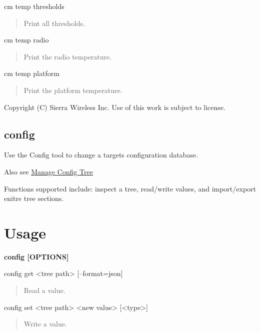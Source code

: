 \begin{DoxyVerb}cm temp thresholds \end{DoxyVerb}
 \begin{quote}
Print all thresholds. \end{quote}


\begin{DoxyVerb}cm temp radio \end{DoxyVerb}
 \begin{quote}
Print the radio temperature. \end{quote}


\begin{DoxyVerb}cm temp platform \end{DoxyVerb}
 \begin{quote}
Print the platform temperature. \end{quote}






Copyright (C) Sierra Wireless Inc. Use of this work is subject to license. \hypertarget{toolsTarget_config}{}\subsection{config}\label{toolsTarget_config}
Use the Config tool to change a target\textquotesingle{}s configuration database.

Also see \hyperlink{howToConfigTree}{Manage Config Tree}

Functions supported include\+: inspect a tree, read/write values, and import/export enitre tree sections.

\section*{Usage}

{\bfseries {\ttfamily  config \mbox{[}O\+P\+T\+I\+O\+N\+S\mbox{]} }}

\begin{DoxyVerb}config get <tree path> [--format=json] \end{DoxyVerb}
 \begin{quote}
Read a value. \end{quote}


\begin{DoxyVerb}config set <tree path> <new value> [<type>] \end{DoxyVerb}
 \begin{quote}
Write a value. \end{quote}



